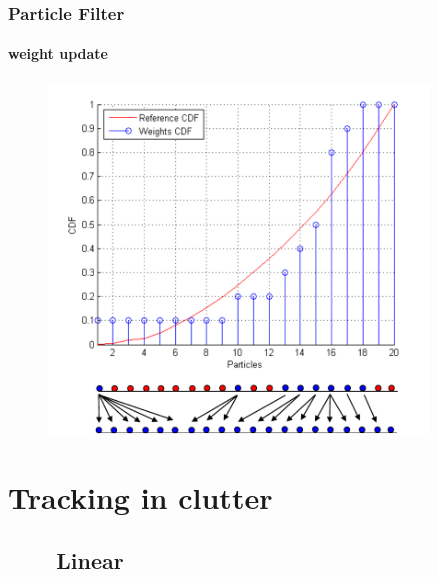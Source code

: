 \begin{frame}
\frametitle{Particle Filter}
\framesubtitle{weight update}
\logoCSIPCPL\mypagenum
	\begin{figure}
		\includegraphics[width=0.9\textwidth]{figs/TRK_ParticleFilter_weightUpdates.pdf}
	\end{figure}	
\end{frame}


\section{Tracking in clutter}

\subsection{\ \ \ \ Linear}

